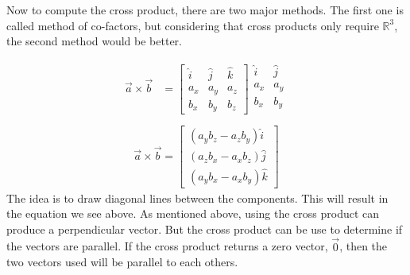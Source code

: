 Now to compute the cross product, there are two major methods. The first one is called method of co-factors, but considering that cross products only require
$\mathbb{R}^3$, the second method would be better.

\begin{align*}
	\vec{a} \times \vec{b} &= 
		\begin{bmatrix} 
			\hat{i} & \hat{j}  & \hat{k} \\ 
			a_x & a_y & a_z \\ 
			b_x & b_y & b_z 
		\end{bmatrix}
		\begin{matrix}
			\hat{i} & \hat{j} \\ 
			a_x & a_y \\ 
			b_x & b_y \\ 
		\end{matrix} \\ 
\end{align*}
\begin{align*}
	\vec{a} \times \vec{b} = \begin{bmatrix} 
						(a_yb_z-a_zb_y)\hat{i} \\
						(a_zb_x-a_xb_z)\hat{j} \\ 
						(a_yb_x-a_xb_y)\hat{k}
						\end{bmatrix}	
\end{align*}
The idea is to draw diagonal lines between the components. This will result in the equation we see above. As mentioned above, using the cross product can produce 
a perpendicular vector. But the cross product can be use to determine if the vectors are parallel. If the cross product returns a zero vector, 
$\vec{0}$, then the two vectors used will be parallel to each others.